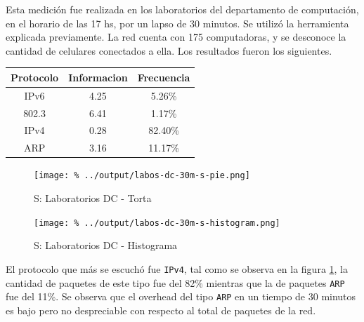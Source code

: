 \documentclass[final,inline,a4paper,narroweqnarray]{ieee}
\begin{document}
    Esta medición fue realizada en los laboratorios del departamento de
    computación, en el horario de las 17 hs, por un lapso de 30 minutos.
    Se utilizó la herramienta explicada previamente. La red cuenta con 175
    computadoras, y se desconoce la cantidad de celulares conectados a ella.
    Los resultados fueron los siguientes.
  
\begin{table}\begin{center}
    \begin{tabular}{|c|c|c|}
    \hline
    Protocolo & Informacion & Frecuencia \\ \hline
    IPv6      & 4.25        & 5.26\%     \\ \hline
    802.3     & 6.41        & 1.17\%     \\ \hline
    IPv4      & 0.28        & 82.40\%    \\ \hline
    ARP       & 3.16        & 11.17\%    \\ \hline
    \end{tabular}
\end{center}\end{table}

	
 
    \begin{figure}[ht]\begin{center}
      \texttt{[image: \%
      ../output/labos-dc-30m-s-pie.png]}
      \vspace{-3em}
      \caption{S: Laboratorios DC - Torta}
      \label{labos-dc-30m-s-pie}
    \end{center}\end{figure}

    \begin{figure}[ht]\begin{center}
      \texttt{[image: \%
      ../output/labos-dc-30m-s-histogram.png]}
      \caption{S: Laboratorios DC - Histograma}
      \label{labos-dc-30m-s-histogram}
    \end{center}\end{figure}


  El protocolo que más se escuchó fue \texttt{IPv4}, tal como se
  observa en la figura \ref{labos-dc-30m-s-pie}, la cantidad de
  paquetes  de este tipo fue del 82\% mientras que la de paquetes
  \texttt{ARP} fue del 11\%. Se observa que el overhead del tipo \texttt{ARP} 
  en un tiempo de 30 minutos es bajo pero no despreciable con respecto al 
  total de paquetes de la red.
\end{document}
